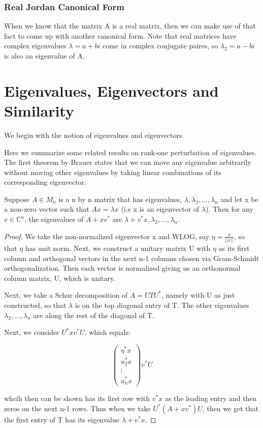 \documentclass[class=article, crop=false]{standalone}
\begin{document}
		\subsubsection{Real Jordan Canonical Form}
			When we know that the matrix A is a real matrix, then we can make use of that fact to come up with another canonical form. Note that real matrices have complex eigenvalues $\lambda = a + bi$ come in complex conjugate paires, so $\lambda_2 = a - bi$ is also an eigenvalue of A.

\section{Eigenvalues, Eigenvectors and Similarity}
	We begin with the notion of eigenvalues and eigenvectors. 

	Here we summarize some related results on rank-one perturbation of eigenvalues. The first theorem by Brauer states that we can move any eigenvalue arbitrarily without moving other eigenvalues by taking linear combinations of its corresponding eigenvector.

	\begin{theorem}
	\label{thm:brauer_rank_one_perturb}
		Suppose $A \in M_n$ is a n by n matrix that has eigenvalues, $\lambda, \lambda_2, ..., \lambda_n$ and let x be a non-zero vector such that $Ax = \lambda x$ (i.e x is an eigenvector of $\lambda$). Then for any $v \in \mathbb{C}^n$, the eigenvalues of $A + xv^*$ are $\lambda + v^*x, \lambda_2,..., \lambda_n$.
	\end{theorem}
	\begin{proof}
		We take the non-normalized eigenvector x and WLOG, say $\eta = \frac{x}{||x||}$, so that $\eta$ has unit norm. Next, we construct a unitary matrix U with $\eta$ as its first column and orthogonal vectors in the next n-1 columns chosen via Gram-Schmidt orthogonalization. Then each vector is normalized giving us an orthonormal column matrix, U, which is unitary.

		Next, we take a Schur decomposition of $A = UTU^*$, namely with U as just constructed, so that $\lambda$ is on the top diagonal entry of T. The other eigenvalues $\lambda_2, ..., \lambda_n$ are along the rest of the diagonal of T.

		Next, we consider $U^* xv^* U$, which equals:

			$$\begin{pmatrix} \eta^* x \\ u^*_2 x \\ \vdots \\ u_n^* x\end{pmatrix} v^* U$$

		whcih then can be shown has its first row with $v^*x$ as the leading entry and then zeros on the next n-1 rows. Thus when we take $U^*(A+xv^*)U$, then we get that the first entry of T has its eigenvalue $\lambda + v^*x$.
	\end{proof}
\end{document}
